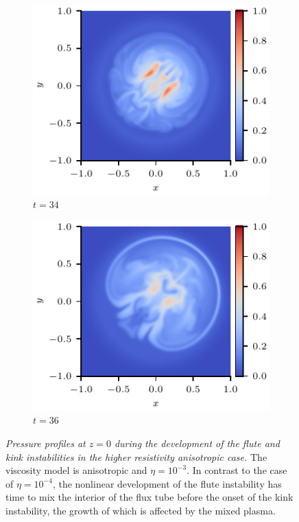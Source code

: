 \documentclass[fleqn,usenatbib]{mnras}
\newcommand{\rs}[2]{{#2}}
\newcommand{\mycaption}[2]{\caption[#1]{\emph{#1} #2}}
\begin{document}
\begin{figure}
\begin{subfigure}{0.32\textwidth}
      \includegraphics[width=\linewidth]{swi-3_pressure_17.pdf}
      \caption{$t=34$}
      \label{fig:swi-3_pressure_17}
    \end{subfigure}
    \hfill
    \begin{subfigure}{0.32\textwidth}
      \includegraphics[width=\linewidth]{swi-3_pressure_18.pdf}
      \caption{$t=36$}
      \label{fig:swi-3_pressure_18}
    \end{subfigure}
\mycaption{Pressure profiles \rs{through}{at} $z=0$ during the development of the flute and kink instabilities in the higher resistivity \rs{switching}{anisotropic} case.}{The viscosity model is \rs{switching}{anisotropic} and $\eta = 10^{-3}$. In contrast to the case of $\eta=10^{-4}$, the nonlinear development of the flute instability has time to mix the interior of the flux tube before the onset of the kink instability, the growth of which is affected by the mixed plasma.}
\label{fig:kink_pressure_slices-3}%
\end{figure}
\end{document}
